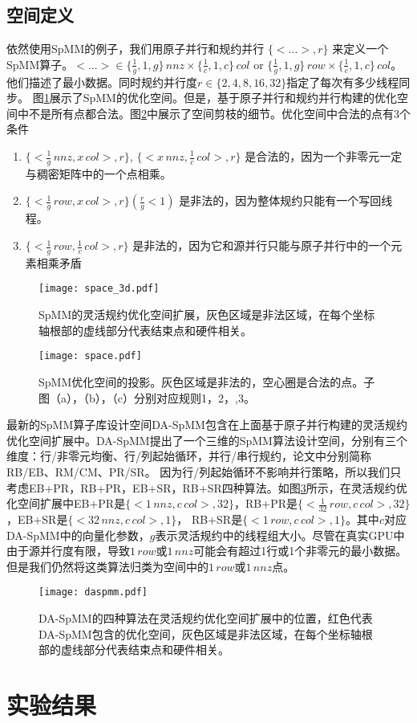 \subsection{空间定义}
依然使用SpMM的例子，我们用原子并行和规约并行 $\{<...>,r\}$ 来定义一个SpMM算子。$<...>\in \{\frac{1}{g},1,g\}\, nnz \times \{\frac{1}{c},1,c\}\, col $ or $\{\frac{1}{g},1,g\}\,row \times \{\frac{1}{c},1,c\}\,col$。他们描述了最小数据。同时规约并行度$r\in\{2,4,8,16,32\}$指定了每次有多少线程同步。 
图\ref{fig:space3d}展示了SpMM的优化空间。但是，基于原子并行和规约并行构建的优化空间中不是所有点都合法。图\ref{fig:space}中展示了空间剪枝的细节。优化空间中合法的点有3个条件
\begin{enumerate}
  \item $\{<\frac{1}{g}\,nnz , x\,col>,r\}$, $\{<x\,nnz , \frac{1}{c}\,col>,r\}$ 
  是合法的，因为一个非零元一定与稠密矩阵中的一个点相乘。
  \item $\{<\frac{1}{g}\,row, x\,col>,r\}(\frac{r}{g}<1)$
  是非法的，因为整体规约只能有一个写回线程。
  \item $\{<\frac{1}{g}\,row , \frac{1}{c}\,col>,r\}$
  是非法的，因为它和源并行只能与原子并行中的一个元素相乘矛盾
\end{enumerate}
\begin{figure}[h]%
  \centering
  \texttt{[image: space\_3d.pdf]}
  \caption{SpMM的灵活规约优化空间扩展，灰色区域是非法区域，在每个坐标轴根部的虚线部分代表结束点和硬件相关。}
  \label{fig:space3d}
\end{figure}
\begin{figure}[h]%
  \centering
  \texttt{[image: space.pdf]}
  \caption{SpMM优化空间的投影。灰色区域是非法的，空心圈是合法的点。子图（a），（b），（c）分别对应规则1，2，,3。}
  \label{fig:space}
\end{figure}
最新的SpMM算子库设计空间DA-SpMM包含在上面基于原子并行构建的灵活规约优化空间扩展中。DA-SpMM提出了一个三维的SpMM算法设计空间，分别有三个维度：行/非零元均衡、行/列起始循环，并行/串行规约，论文中分别简称RB/EB、RM/CM、PR/SR。
因为行/列起始循环不影响并行策略，所以我们只考虑EB+PR，RB+PR，EB+SR，RB+SR四种算法。如图\ref{fig:daspmm}所示，在灵活规约优化空间扩展中EB+PR是$\{<1\,nnz , c\,col>,32\}$，RB+PR是$\{<\frac{1}{32}\,row, c\,col>,32\}$，EB+SR是$\{<32\,nnz,c\,col >,1\}$，
RB+SR是$\{<1\,row,c\,col >,1\}$。其中$c$对应DA-SpMM中的向量化参数，$g$表示灵活规约中的线程组大小。尽管在真实GPU中由于源并行度有限，导致$1\,row$或$1\,nnz$可能会有超过1行或1个非零元的最小数据。但是我们仍然将这类算法归类为空间中的$1\,row$或$1\,nnz$点。
\begin{figure}[h]%
  \centering
  \texttt{[image: daspmm.pdf]}
  \caption{DA-SpMM的四种算法在灵活规约优化空间扩展中的位置，红色代表DA-SpMM包含的优化空间，灰色区域是非法区域，在每个坐标轴根部的虚线部分代表结束点和硬件相关。}
  \label{fig:daspmm}
\end{figure}

\section{实验结果}
